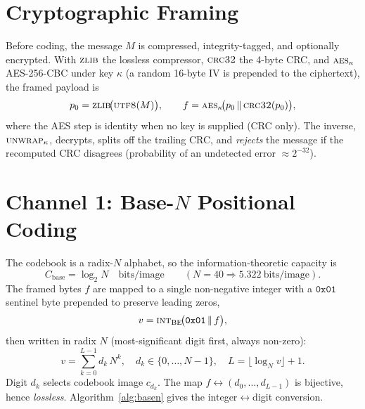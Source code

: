 \documentclass[11pt]{article}
\newcommand{\concat}{\,\Vert\,}
\begin{document}
\section{Cryptographic Framing}
Before coding, the message $M$ is compressed, integrity-tagged, and optionally
encrypted. With $\textsc{zlib}$ the lossless compressor, $\textsc{crc32}$ the
4-byte CRC, and $\textsc{aes}_\kappa$ AES-256-CBC under key $\kappa$ (a random
16-byte IV is prepended to the ciphertext), the framed payload is
\begin{equation}
  p_0=\textsc{zlib}\!\big(\textsc{utf8}(M)\big),\qquad
  f=\textsc{aes}_{\kappa}\!\big(p_0\concat \textsc{crc32}(p_0)\big),
  \label{eq:wrap}
\end{equation}
where the AES step is identity when no key is supplied (CRC only). The inverse,
$\textsc{unwrap}_\kappa$, decrypts, splits off the trailing CRC, and \emph{rejects}
the message if the recomputed CRC disagrees (probability of an undetected error
$\approx 2^{-32}$).

\section{Channel 1: Base-$N$ Positional Coding}
The codebook is a radix-$N$ alphabet, so the information-theoretic capacity is
\begin{equation}
  C_{\text{base}}=\log_2 N \quad\text{bits/image}
  \qquad(N{=}40 \Rightarrow 5.322\ \text{bits/image}).
  \label{eq:capbase}
\end{equation}
The framed bytes $f$ are mapped to a single non-negative integer with a
$\mathtt{0x01}$ sentinel byte prepended to preserve leading zeros,
\begin{equation}
  v=\textsc{int}_{\mathrm{BE}}\!\big(\mathtt{0x01}\concat f\big),
  \label{eq:int}
\end{equation}
then written in radix $N$ (most-significant digit first, always non-zero):
\begin{equation}
  v=\sum_{k=0}^{L-1} d_k\,N^{k},\quad d_k\in\{0,\dots,N-1\},\quad
  L=\big\lfloor\log_N v\big\rfloor+1 .
  \label{eq:digits}
\end{equation}
Digit $d_k$ selects codebook image $c_{d_k}$. The map
$f\leftrightarrow(d_0,\dots,d_{L-1})$ is bijective, hence \emph{lossless}.
Algorithm~\ref{alg:basen} gives the integer$\leftrightarrow$digit conversion.
\end{document}
